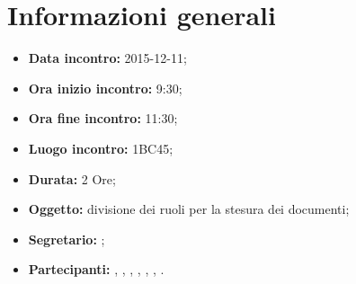 \newpage
\section{Informazioni generali}
\begin{itemize}
\item \textbf{Data incontro:} 2015-12-11;
\item \textbf{Ora inizio incontro:} 9:30;
\item \textbf{Ora fine incontro:} 11:30;
\item \textbf{Luogo incontro:} 1BC45;
\item \textbf{Durata:} 2 Ore;
\item \textbf{Oggetto:} divisione dei ruoli per la stesura dei documenti;
\item \textbf{Segretario:} \AF;
\item \textbf{Partecipanti:} \AF, \FB, \GN, \GR, \MV, \MP, \SM.

\end{itemize}
